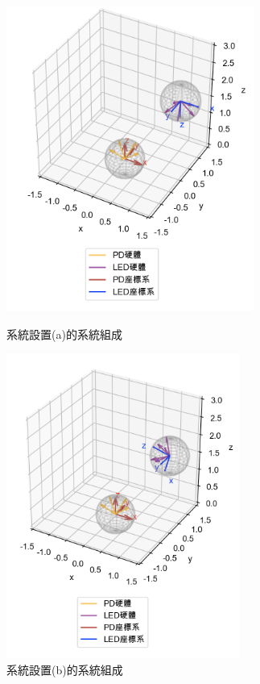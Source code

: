     \begin{figure}[htpb]
    \centering
    \begin{minipage}{.5\textwidth}
        \centering
        \includegraphics[height=10cm]{ch4pic/set_a.png}
        \caption{系統設置(a)的系統組成}
        \label{pic:set_a}
    \end{minipage}%
    \begin{minipage}{0.5\textwidth}
        \centering
        \includegraphics[height=10cm]{ch4pic/set_b.png}
        \caption{系統設置(b)的系統組成}
        \label{pic:set_b}
    \end{minipage}

    \end{figure}

